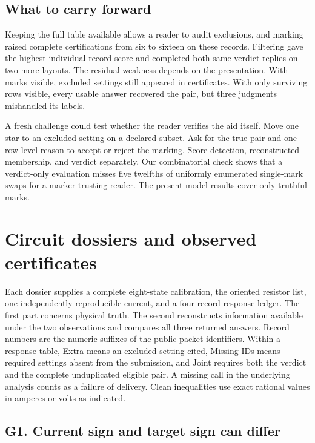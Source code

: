 \documentclass[12pt,letterpaper]{article}
\begin{document}
\subsection{What to carry forward}

Keeping the full table available allows a reader to audit exclusions, and marking raised complete certifications from six to sixteen on these records. Filtering gave the highest individual-record score and completed both same-verdict replies on two more layouts. The residual weakness depends on the presentation. With marks visible, excluded settings still appeared in certificates. With only surviving rows visible, every usable answer recovered the pair, but three judgments mishandled its labels.

A fresh challenge could test whether the reader verifies the aid itself. Move one star to an excluded setting on a declared subset. Ask for the true pair and one row-level reason to accept or reject the marking. Score detection, reconstructed membership, and verdict separately. Our combinatorial check shows that a verdict-only evaluation misses five twelfths of uniformly enumerated single-mark swaps for a marker-trusting reader. The present model results cover only truthful marks.


\clearpage\section{Circuit dossiers and observed certificates}\label{dossiers}
Each dossier supplies a complete eight-state calibration, the oriented resistor list, one independently reproducible current, and a four-record response ledger. The first part concerns physical truth. The second reconstructs information available under the two observations and compares all three returned answers. Record numbers are the numeric suffixes of the public packet identifiers. Within a response table, Extra means an excluded setting cited, Missing IDs means required settings absent from the submission, and Joint requires both the verdict and the complete unduplicated eligible pair. A missing call in the underlying analysis counts as a failure of delivery. Clean inequalities use exact rational values in amperes or volts as indicated.

\subsection*{G1. Current sign and target sign can differ}\label{netG1}
\end{document}
